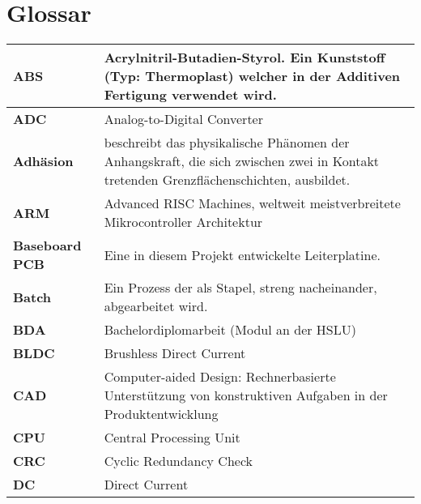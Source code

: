 \newpage


\section*{Glossar}\label{dok:glossar}


\begin{table}[H]
	\footnotesize
	\begin{tabular}{|L{3cm}|L{12.3cm}|}
		\hline	
		\textbf{ABS} & Acrylnitril-Butadien-Styrol. Ein Kunststoff (Typ: Thermoplast) welcher in der Additiven Fertigung verwendet wird.\\
		
		\hline	
		\textbf{ADC} & Analog-to-Digital Converter\\
		
		\hline
		\textbf{Adhäsion} & beschreibt das physikalische Phänomen der Anhangskraft, die sich zwischen zwei in Kontakt tretenden Grenzflächenschichten, ausbildet. \\		

		\hline	
		\textbf{ARM} & Advanced RISC Machines, weltweit meistverbreitete Mikrocontroller Architektur\\

		\hline
		\textbf{Baseboard PCB} & Eine in diesem Projekt entwickelte Leiterplatine. \\

		\hline
		\textbf{Batch} & Ein Prozess der als Stapel, streng nacheinander, abgearbeitet wird.  \\

		\hline
		\textbf{BDA} & Bachelordiplomarbeit (Modul an der HSLU) \\

		\hline
		\textbf{BLDC} & Brushless Direct Current\\

		\hline
		\textbf{CAD} & Computer-aided Design: Rechnerbasierte Unterstützung von konstruktiven Aufgaben in der Produktentwicklung \\
		
		\hline
		\textbf{CPU} & Central Processing Unit \\
		
		\hline
		\textbf{CRC} & Cyclic Redundancy Check \\

		\hline	
		\textbf{DC} & Direct Current\\


\end{tabular}
\end{table}
